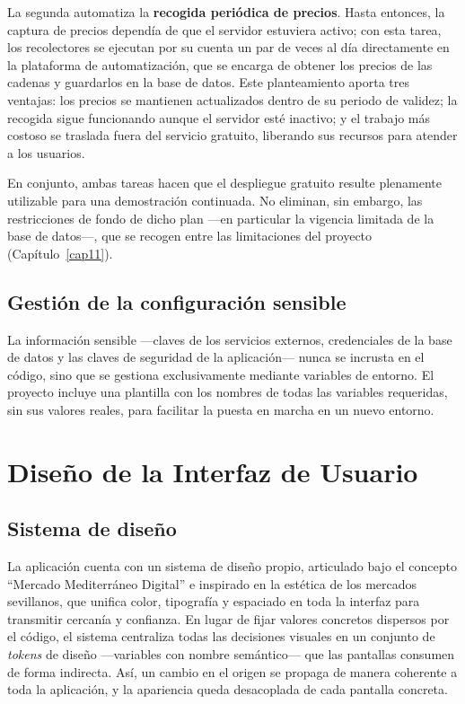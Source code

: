 La segunda automatiza la \textbf{recogida peri\'odica de precios}. Hasta entonces, la captura de
precios depend\'ia de que el servidor estuviera activo; con esta tarea, los recolectores se ejecutan
por su cuenta un par de veces al d\'ia directamente en la plataforma de automatizaci\'on, que se
encarga de obtener los precios de las cadenas y guardarlos en la base de datos. Este planteamiento
aporta tres ventajas: los precios se mantienen actualizados dentro de su periodo de validez; la
recogida sigue funcionando aunque el servidor est\'e inactivo; y el trabajo m\'as costoso se traslada
fuera del servicio gratuito, liberando sus recursos para atender a los usuarios.

En conjunto, ambas tareas hacen que el despliegue gratuito resulte plenamente utilizable para una
demostraci\'on continuada. No eliminan, sin embargo, las restricciones de fondo de dicho plan
---en particular la vigencia limitada de la base de datos---, que se recogen entre las limitaciones
del proyecto (Cap\'itulo~\ref{cap11}).

\subsection{Gesti\'on de la configuraci\'on sensible}\label{subsec:env}

La informaci\'on sensible ---claves de los servicios externos, credenciales de la base de datos y
las claves de seguridad de la aplicaci\'on--- nunca se incrusta en el c\'odigo, sino que se
gestiona exclusivamente mediante variables de entorno. El proyecto incluye una plantilla con los
nombres de todas las variables requeridas, sin sus valores reales, para facilitar la puesta en
marcha en un nuevo entorno.

\section{Dise\~no de la Interfaz de Usuario}\label{sec:ui}

\subsection{Sistema de dise\~no}\label{subsec:design-system}

La aplicaci\'on cuenta con un sistema de dise\~no propio, articulado bajo el concepto ``Mercado
Mediterr\'aneo Digital'' e inspirado en la est\'etica de los mercados sevillanos, que unifica color,
tipograf\'ia y espaciado en toda la interfaz para transmitir cercan\'ia y confianza. En lugar de
fijar valores concretos dispersos por el c\'odigo, el sistema centraliza todas las decisiones
visuales en un conjunto de \emph{tokens} de dise\~no ---variables con nombre sem\'antico--- que las
pantallas consumen de forma indirecta. As\'i, un cambio en el origen se propaga de manera coherente
a toda la aplicaci\'on, y la apariencia queda desacoplada de cada pantalla concreta.

